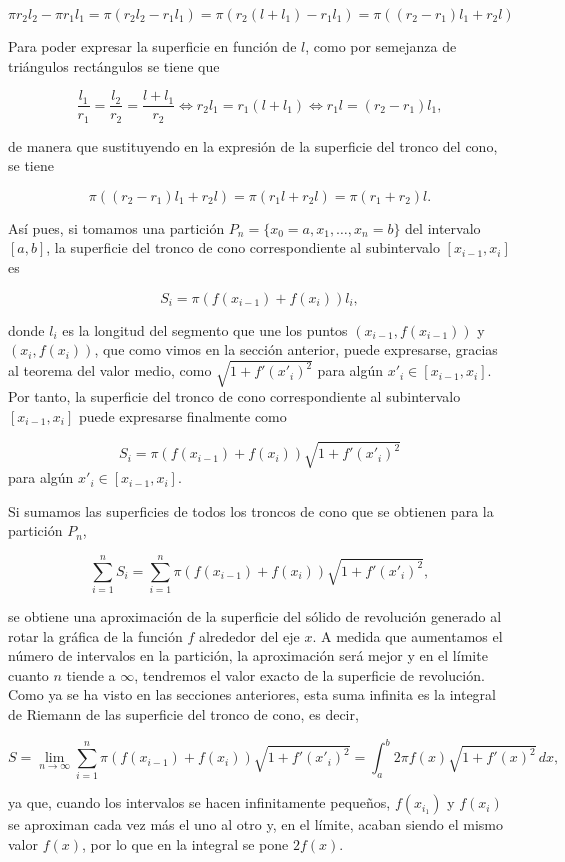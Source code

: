 \documentclass[
  a4paper,
]{scrreport}
\theoremstyle{definition}
\theoremstyle{definition}
\theoremstyle{definition}
\theoremstyle{plain}
\theoremstyle{plain}
\theoremstyle{plain}
\theoremstyle{remark}
\begin{document}
\[
\pi r_2 l_2 - \pi r_1 l_1 = \pi (r_2l_2-r_1l_1) = \pi(r_2(l+l_1)-r_1l_1) = \pi ((r_2-r_1)l_1+r_2l)
\]

Para poder expresar la superficie en función de \(l\), como por
semejanza de triángulos rectángulos se tiene que

\[
\frac{l_1}{r_1}=\frac{l_2}{r_2}=\frac{l+l_1}{r_2} \Leftrightarrow r_2l_1 = r_1(l+l_1) \Leftrightarrow r_1l = (r_2-r_1)l_1,
\]

de manera que sustituyendo en la expresión de la superficie del tronco
del cono, se tiene

\[
\pi ((r_2-r_1)l_1+r_2l) =  \pi (r_1l+r_2l) = \pi (r_1+r_2) l.
\]

Así pues, si tomamos una partición \(P_n=\{x_0=a, x_1, \ldots, x_n=b\}\)
del intervalo \([a,b]\), la superficie del tronco de cono
correspondiente al subintervalo \([x_{i-1},x_i]\) es

\[ 
S_i = \pi (f(x_{i-1})+f(x_i))l_i,
\]

donde \(l_i\) es la longitud del segmento que une los puntos
\((x_{i-1},f(x_{i-1}))\) y \((x_i,f(x_i))\), que como vimos en la
sección anterior, puede expresarse, gracias al teorema del valor medio,
como \(\sqrt{1+f'(x'_i)^2}\) para algún \(x'_i \in [x_{i-1},x_i]\). Por
tanto, la superficie del tronco de cono correspondiente al subintervalo
\([x_{i-1},x_i]\) puede expresarse finalmente como

\[
S_i = \pi (f(x_{i-1})+f(x_i))\sqrt{1+f'(x'_i)^2}
\] para algún \(x'_i\in [x_{i-1},x_i]\).

Si sumamos las superficies de todos los troncos de cono que se obtienen
para la partición \(P_n\),

\[
\sum_{i=1}^n S_i = \sum_{i=1}^n \pi (f(x_{i-1})+f(x_i))\sqrt{1+f'(x'_i)^2},
\]

se obtiene una aproximación de la superficie del sólido de revolución
generado al rotar la gráfica de la función \(f\) alrededor del eje
\(x\). A medida que aumentamos el número de intervalos en la partición,
la aproximación será mejor y en el límite cuanto \(n\) tiende a
\(\infty\), tendremos el valor exacto de la superficie de revolución.
Como ya se ha visto en las secciones anteriores, esta suma infinita es
la integral de Riemann de las superficie del tronco de cono, es decir,

\[
S = \lim_{n\to\infty} \sum_{i=1}^n \pi (f(x_{i-1})+f(x_i))\sqrt{1+f'(x'_i)^2} = \int_a^b 2 \pi f(x)\sqrt{1+f'(x)^2}\,dx,
\]

ya que, cuando los intervalos se hacen infinitamente pequeños,
\(f(x_{i_1})\) y \(f(x_i)\) se aproximan cada vez más el uno al otro y,
en el límite, acaban siendo el mismo valor \(f(x)\), por lo que en la
integral se pone \(2 f(x)\).
\end{document}
